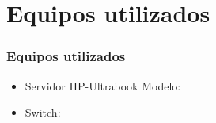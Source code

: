 \section{Equipos utilizados}
  \begin{frame}
    \frametitle{Equipos utilizados}
    \begin{itemize}
      \item Servidor HP-Ultrabook Modelo: 
      \item Switch: 
    \end{itemize}
  \end{frame}